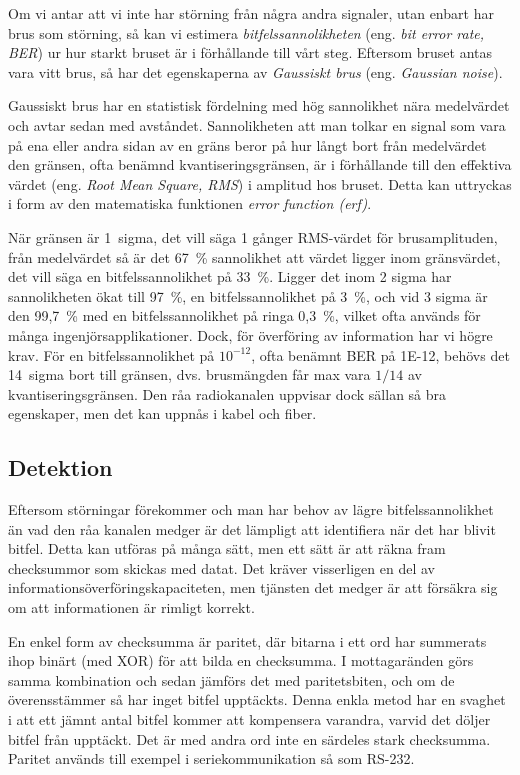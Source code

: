 Om vi antar att vi inte har störning från några andra signaler, utan enbart har
brus som störning, så kan vi estimera \emph{bitfelssannolikheten} (eng.
\emph{bit error rate, BER}) ur hur starkt bruset är i förhållande till vårt
steg.
Eftersom bruset antas vara vitt brus, så har det egenskaperna av \emph{Gaussiskt
brus} (eng. \emph{Gaussian noise}).

Gaussiskt brus har en statistisk fördelning med hög sannolikhet nära
medelvärdet och avtar sedan med avståndet.
Sannolikheten att man tolkar en signal som vara på ena eller andra sidan av en
gräns beror på hur långt bort från medelvärdet den gränsen, ofta benämnd
kvantiseringsgränsen, är i förhållande till den effektiva värdet (eng.
\emph{Root Mean Square, RMS}) i amplitud hos bruset.
Detta kan uttryckas i form av den matematiska funktionen \emph{error function
(erf)}.

När gränsen är 1~sigma, det vill säga 1 gånger RMS-värdet för brusamplituden,
från medelvärdet så är det 67~\% sannolikhet att värdet ligger inom
gränsvärdet, det vill säga en bitfelssannolikhet på 33~\%.
Ligger det inom 2 sigma har sannolikheten ökat till 97~\%, en
bitfelssannolikhet på 3~\%, och vid 3 sigma är den 99,7~\% med en
bitfelssannolikhet på ringa 0,3~\%, vilket ofta används för många
ingenjörsapplikationer.
Dock, för överföring av information har vi högre krav.
För en bitfelssannolikhet på \(10^{-12}\), ofta benämnt BER på 1E-12, behövs
det 14~sigma bort till gränsen, dvs. brusmängden får max vara \(1/14\) av
kvantiseringsgränsen.
Den råa radiokanalen uppvisar dock sällan så bra egenskaper, men det kan uppnås
i kabel och fiber.

\subsection{Detektion}
\label{bitfel_detektion}

Eftersom störningar förekommer och man har behov av lägre bitfelssannolikhet
än vad den råa kanalen medger är det lämpligt att identifiera när det har
blivit bitfel.
Detta kan utföras på många sätt, men ett sätt är att räkna fram checksummor som
skickas med datat.
Det kräver visserligen en del av informationsöverföringskapaciteten, men
tjänsten det medger är att försäkra sig om att informationen är rimligt korrekt.

En enkel form av checksumma är paritet, där bitarna i ett ord har summerats ihop
binärt (med XOR) för att bilda en checksumma.
I mottagaränden görs samma kombination och sedan jämförs det med paritetsbiten,
och om de överensstämmer så har inget bitfel upptäckts.
Denna enkla metod har en svaghet i att ett jämnt antal bitfel kommer att
kompensera varandra, varvid det döljer bitfel från upptäckt.
Det är med andra ord inte en särdeles stark checksumma.
Paritet används till exempel i seriekommunikation så som RS-232.


